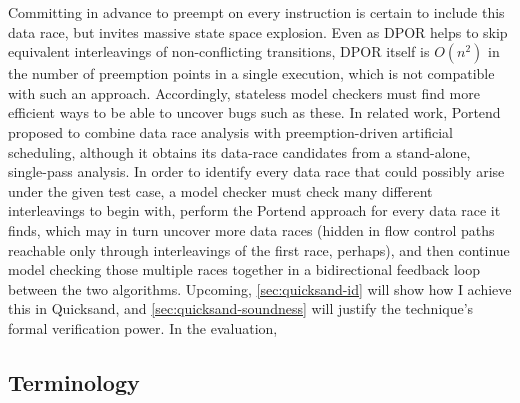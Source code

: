 Committing in advance to
preempt on every instruction is certain to include this data race,
but invites massive state space explosion.
Even as DPOR helps to skip equivalent interleavings of non-conflicting transitions,
DPOR itself is $O(n^2)$ in the number of preemption points in a single execution,
which is not compatible with such an approach.
Accordingly, stateless model checkers must find more efficient ways to be able to uncover bugs such as these.
%
In related work,
Portend~\cite{portend} proposed to combine data race analysis with preemption-driven artificial scheduling,
although it obtains its data-race candidates from a stand-alone, single-pass analysis.
In order to
identify every
data race that could possibly arise under the given test case,
a model checker must check many different interleavings to begin with,
perform the Portend approach for every data race it finds,
which may in turn uncover more data races
(hidden in flow control paths reachable only through interleavings of the first race, perhaps),
and then continue model checking those multiple races together
in a
bidirectional feedback loop between the two algorithms.
Upcoming,
\cref{sec:quicksand-id} will show how I achieve this in Quicksand, and
\cref{sec:quicksand-soundness} will justify the technique's formal verification power.
In the evaluation, %

\subsection{Terminology}

